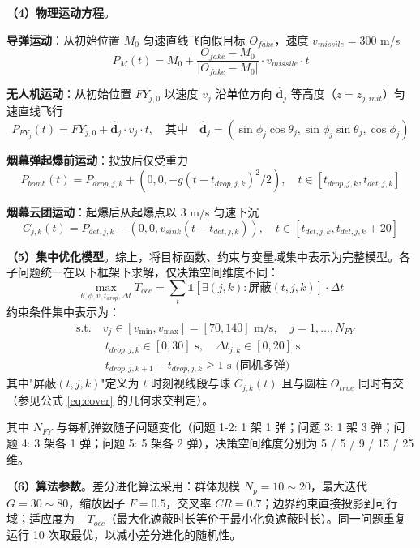 \textbf{（4）物理运动方程}。

\textbf{导弹运动}：从初始位置 $M_0$ 匀速直线飞向假目标 $O_{fake}$，速度 $v_{missile} = 300$ m/s
\begin{equation}
P_M(t) = M_0 + \frac{O_{fake} - M_0}{|O_{fake} - M_0|} \cdot v_{missile} \cdot t
\end{equation}

\textbf{无人机运动}：从初始位置 $FY_{j,0}$ 以速度 $v_j$ 沿单位方向 $\hat{\mathbf{d}}_j$ 等高度（$z = z_{j,init}$）匀速直线飞行
\begin{equation}
P_{FY_j}(t) = FY_{j,0} + \hat{\mathbf{d}}_j \cdot v_j \cdot t, \quad \text{其中} \quad \hat{\mathbf{d}}_j = (\sin\phi_j \cos\theta_j, \sin\phi_j \sin\theta_j, \cos\phi_j)
\end{equation}

\textbf{烟幕弹起爆前运动}：投放后仅受重力
\begin{equation}
P_{bomb}(t) = P_{drop,j,k} + (0, 0, -g(t - t_{drop,j,k})^2 / 2), \quad t \in [t_{drop,j,k}, t_{det,j,k}]
\end{equation}

\textbf{烟幕云团运动}：起爆后从起爆点以 3 m/s 匀速下沉
\begin{equation}
C_{j,k}(t) = P_{det,j,k} - (0, 0, v_{sink}(t - t_{det,j,k})), \quad t \in [t_{det,j,k}, t_{det,j,k} + 20]
\end{equation}

\textbf{（5）集中优化模型}。综上，将目标函数、约束与变量域集中表示为完整模型。各子问题统一在以下框架下求解，仅决策空间维度不同：
\begin{equation}
\max_{\theta, \phi, v, t_{drop}, \Delta t}
T_{occ} = \sum_{t} \mathbb{1}\!\left[\exists (j,k): \text{屏蔽}(t, j, k)\right] \cdot \Delta t
\label{eq:obj}
\end{equation}
约束条件集中表示为：
\begin{equation}
\begin{aligned}
& \text{s.t.} \quad v_j \in [v_{\min}, v_{\max}] = [70, 140] \text{ m/s}, \quad j = 1, \dots, N_{FY} \\
& \quad\quad\;\; t_{drop,j,k} \in [0, 30] \text{ s}, \quad \Delta t_{j,k} \in [0, 20] \text{ s} \\
& \quad\quad\;\; t_{drop,j,k+1} - t_{drop,j,k} \ge 1 \text{ s (同机多弹)}
\end{aligned}
\label{eq:cons}
\end{equation}
其中"屏蔽$(t, j, k)$"定义为 $t$ 时刻视线段与球 $C_{j,k}(t)$ 且与圆柱 $O_{true}$ 同时有交（参见公式 \eqref{eq:cover} 的几何求交判定）。

其中 $N_{FY}$ 与每机弹数随子问题变化（问题 1-2: 1 架 1 弹；问题 3: 1 架 3 弹；问题 4: 3 架各 1 弹；问题 5: 5 架各 2 弹），决策空间维度分别为 5 / 5 / 9 / 15 / 25 维。

\textbf{（6）算法参数}。差分进化算法采用：群体规模 $N_p = 10 \sim 20$，最大迭代 $G = 30 \sim 80$，缩放因子 $F = 0.5$，交叉率 $CR = 0.7$；边界约束直接投影到可行域；适应度为 $-T_{occ}$（最大化遮蔽时长等价于最小化负遮蔽时长）。同一问题重复运行 10 次取最优，以减小差分进化的随机性。
